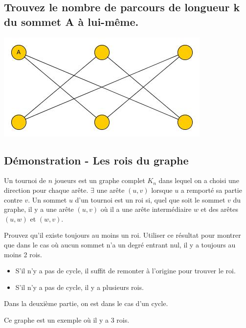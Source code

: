 \subsection{Trouvez le nombre de parcours de longueur k du sommet A à lui-même.}
\includegraphics[scale=0.5]{graph_ape1_ex5}


\subsection{Démonstration - Les rois du graphe}
Un tournoi de $n$ joueurs est un graphe complet $K_{n}$ dans lequel on a choisi une direction pour chaque arête.
$\exists$ une arête $(u,v)$ lorsque $u$ a remporté sa partie contre $v$.
Un sommet $u$ d'un tournoi est un roi si, quel que soit le sommet $v$ du graphe,
il y a une arête $(u,v)$ où il a une arête intermédiaire $w$ et des arêtes $(u,w)$ et $(w,v)$.

Prouvez qu'il existe toujours au moins un roi.
Utiliser ce résultat pour montrer que dans le cas où aucun sommet n'a un degré entrant nul, il y a toujours au moins 2 rois.
\begin{solution}
\begin{itemize}
\item S'il n'y a pas de cycle, il suffit de remonter à l'origine pour trouver le roi.
\item S'il n'y a pas de cycle, il y a plusieurs rois.
\end{itemize}

Dans la deuxième partie, on est dans le cas d'un cycle.

Ce graphe est un exemple où il y a 3 rois.

\end{solution}
